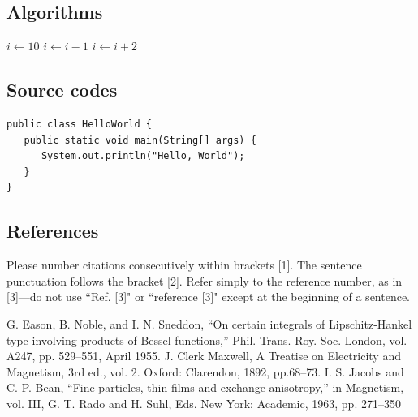 \documentclass{article}
\begin{document}
\subsection{Algorithms}
\begin{algorithmic}
\STATE $i\gets 10$
\STATE $i\gets i-1$
\ELSE
{}\STATE $i\gets i+2$
\ENDIF
\ENDIF
\end{algorithmic}

\subsection{Source codes}
\begin{verbatim}
public class HelloWorld {
   public static void main(String[] args) {
      System.out.println("Hello, World");
   }
}
\end{verbatim}

\subsection{References}
Please number citations consecutively within brackets [1]. The sentence punctuation follows the bracket [2]. Refer simply to the reference number, as in [3]---do not use ``Ref. [3]" or ``reference [3]" except at the beginning of a sentence.

\begin{thebibliography}{00}
 G. Eason, B. Noble, and I. N. Sneddon, ``On certain integrals of Lipschitz-Hankel type involving products of Bessel functions,'' Phil. Trans. Roy. Soc. London, vol. A247, pp. 529--551, April 1955.
 J. Clerk Maxwell, A Treatise on Electricity and Magnetism, 3rd ed., vol. 2. Oxford: Clarendon, 1892, pp.68--73.
 I. S. Jacobs and C. P. Bean, ``Fine particles, thin films and exchange anisotropy,'' in Magnetism, vol. III, G. T. Rado and H. Suhl, Eds. New York: Academic, 1963, pp. 271--350
\end{thebibliography}
\end{document}
